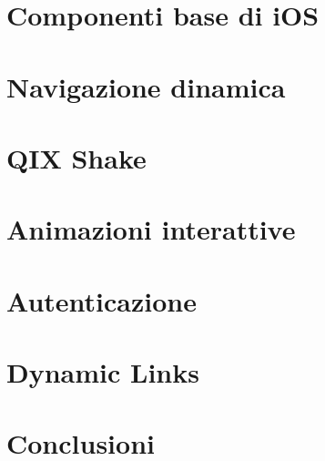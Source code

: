 \documentclass[12pt,a4paper]{book}
\begin{document}
    \chapter{Componenti base di iOS }
    \label{CH:2}
    

    \chapter{Navigazione dinamica}
    \label{CH:3}
    

    \chapter{QIX Shake}
    \label{CH:4}
    
    
    \chapter{Animazioni interattive}
    \label{CH:5}
    

    \chapter{Autenticazione}
    \label{CH:6}
    
    
    \chapter{Dynamic Links}
    \label{CH:7}
    
    
    \chapter{Conclusioni}
    \label{CH:Concl}
    
    
    
    
    
    
    \listoffigures
\end{document}
